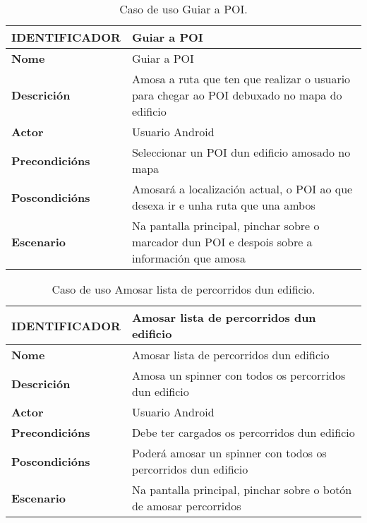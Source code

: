 \begin{table}[tbh]
	\footnotesize
	\centering
	\begin{tabular}{|l|p{10cm}|}
		\hline 
		\textbf{IDENTIFICADOR}	& \textbf{Guiar a POI} \\ 
		\hline 
		\textbf{Nome} & Guiar a POI \\ 
		\hline 
		\textbf{Descrición} & Amosa a ruta que ten que realizar o usuario para chegar ao POI debuxado no mapa do edificio \\ 
		\hline 
		\textbf{Actor} & Usuario Android \\ 
		\hline 
		\textbf{Precondicións} & Seleccionar un POI dun edificio amosado no mapa \\ 
		\hline 
		\textbf{Poscondicións} & Amosará a localización actual, o POI ao que desexa ir e unha ruta que una ambos \\ 
		\hline 
		\textbf{Escenario} & Na pantalla principal, pinchar sobre o marcador dun POI e despois sobre a información que amosa \\ 
		\hline 
	\end{tabular}
	\caption{Caso de uso Guiar a POI.}
	\label{tab:cuGuiarPOI}
\end{table}

\begin{table}[tbh]
	\footnotesize
	\centering
	\begin{tabular}{|l|p{10cm}|}
		\hline 
		\textbf{IDENTIFICADOR}	& \textbf{Amosar lista de percorridos dun edificio} \\ 
		\hline 
		\textbf{Nome} & Amosar lista de percorridos dun edificio \\ 
		\hline 
		\textbf{Descrición} & Amosa un spinner con todos os percorridos dun edificio \\ 
		\hline 
		\textbf{Actor} & Usuario Android \\ 
		\hline 
		\textbf{Precondicións} & Debe ter cargados os percorridos dun edificio \\ 
		\hline 
		\textbf{Poscondicións} & Poderá amosar un spinner con todos os percorridos dun edificio \\ 
		\hline 
		\textbf{Escenario} & Na pantalla principal, pinchar sobre o botón de amosar percorridos \\ 
		\hline 
	\end{tabular}
	\caption{Caso de uso Amosar lista de percorridos dun edificio.}
	\label{tab:cuAmosarListaPercorrido}
\end{table}

